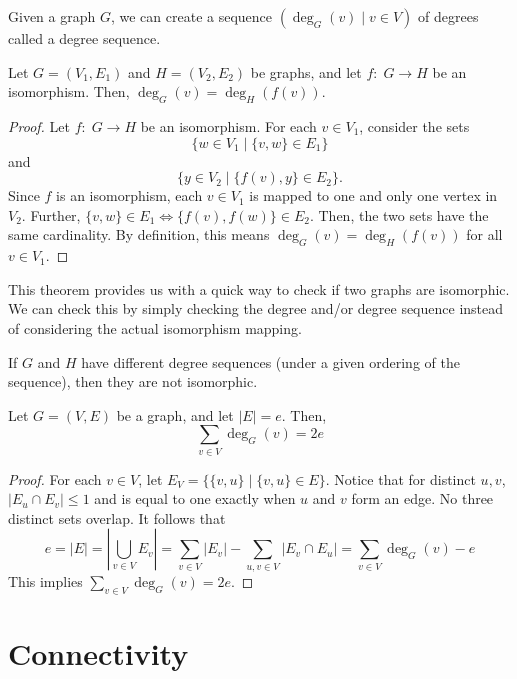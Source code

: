 \begin{definition}
    Given a graph $G$, we can create a sequence $(\deg_G(v) \mid v \in V)$ of degrees called a degree sequence.
\end{definition}

\begin{theorem}
    Let $G = (V_1,E_1)$ and $H = (V_2,E_2)$ be graphs, and let $f:\; G \to H$ be an isomorphism. Then, $\deg_G(v) = \deg_H(f(v))$.
\end{theorem}

\begin{proof}
    Let $f:\; G \to H$ be an isomorphism. For each $v \in V_1$, consider the sets
    $$
    \{w \in V_1 \mid \{v,w\} \in E_1\}
    $$
    and
    $$
    \{y \in V_2 \mid \{f(v),y\} \in E_2\}.
    $$
    Since $f$ is an isomorphism, each $v \in V_1$ is mapped to one and only one vertex in $V_2$. Further, $\{v,w\} \in E_1 \iff \{f(v),f(w)\} \in E_2$. Then, the two sets have the same cardinality. By definition, this means $\deg_G(v) = \deg_H(f(v))$ for all $v \in V_1$.
\end{proof}

This theorem provides us with a quick way to check if two graphs are isomorphic. We can check this by simply checking the degree and/or degree sequence instead of considering the actual isomorphism mapping.

\begin{corollary}
    If $G$ and $H$ have different degree sequences (under a given ordering of the sequence), then they are not isomorphic.
\end{corollary}

\begin{lemma}
    Let $G=(V,E)$ be a graph, and let $|E| = e$. Then,
    $$
    \sum_{v \in V} \deg_G(v) = 2e
    $$
\end{lemma}

\begin{proof}
    For each $v \in V$, let $E_V = \{\{v,u\} \mid \{v,u\} \in E\}$. Notice that for distinct $u,v$, $|E_u \cap E_v| \leq 1$ and is equal to one exactly when $u$ and $v$ form an edge. No three distinct sets overlap. It follows that
    $$
    e = |E| = \left| \bigcup_{v \in V} E_v \right| = \sum_{v \in V} |E_v| - \sum_{u,v \in V} |E_v \cap E_u| = \sum_{v \in V} \deg_G(v) - e
    $$
    This implies $\sum_{v \in V} \deg_G(v) = 2e$.
\end{proof}

\section{Connectivity}

